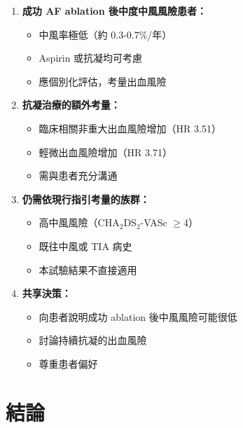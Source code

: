 \documentclass[12pt,a4paper]{article}
\begin{document}
\begin{tcolorbox}[
    colback=emergency_blue!5!white,
    colframe=emergency_blue,
    title=\textbf{臨床建議},
    fonttitle=\bfseries
]
\begin{enumerate}
    \item \textbf{成功 AF ablation 後中度中風風險患者：}
    \begin{itemize}
        \item 中風率極低（約 0.3-0.7\%/年）
        \item Aspirin 或抗凝均可考慮
        \item 應個別化評估，考量出血風險
    \end{itemize}

    \item \textbf{抗凝治療的額外考量：}
    \begin{itemize}
        \item 臨床相關非重大出血風險增加（HR 3.51）
        \item 輕微出血風險增加（HR 3.71）
        \item 需與患者充分溝通
    \end{itemize}

    \item \textbf{仍需依現行指引考量的族群：}
    \begin{itemize}
        \item 高中風風險（CHA$_2$DS$_2$-VASc $\geq$4）
        \item 既往中風或 TIA 病史
        \item 本試驗結果不直接適用
    \end{itemize}

    \item \textbf{共享決策：}
    \begin{itemize}
        \item 向患者說明成功 ablation 後中風風險可能很低
        \item 討論持續抗凝的出血風險
        \item 尊重患者偏好
    \end{itemize}
\end{enumerate}
\end{tcolorbox}

\section{結論}
\end{document}
